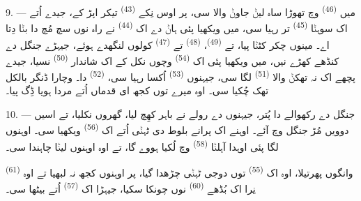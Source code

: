 9. --- میں  \textsuperscript{(46)} وچ تھوڑا ساہ لیݨ
جاوݨ والا سی، پر اوس نِکے  \textsuperscript{(43)} تیکر اپڑ کے، جیدے اُتے
اک سوہݨا  \textsuperscript{(45)} تر رہیا سی، میں ویکھیا پئی ہاݨ دے اک
 \textsuperscript{(44)} نے راہ نوں سچ مُچ دا  بݨا دِتا اے۔
مینوں چکر کٹݨا پیا، تے  \textsuperscript{(49)}، 
\textsuperscript{(48)} تے  \textsuperscript{(47)} کولوں لنگھدے ہوئے،
جیہڑے جنگل دے کنڈھے کھڑے نیں، میں ویکھیا پئی اک 
\textsuperscript{(54)} وچوں نکل کے اک شاندار  \textsuperscript{(50)}
نسیا، جیدے پچھے اک نہ تھکݨ والا  \textsuperscript{(51)}
لگا سی، جیہنوں  \textsuperscript{(53)} اُکسا رہیا سی،
 \textsuperscript{(52)} دا۔ وچارا ڈنگر بالکل تھک
چُکیا سی۔ اوہ میرے توں کجھ ای قدماں اُتے مردا ہویا ڈِگ پیا۔

10. --- جنگل دے رکھوالے دا پُتر، جیہنوں  دے رولے نے باہر کھِچ لیا، گھروں
نکلیا، تے اسیں دوویں مُڑ جنگل وچ آئے۔ اوہنے اک پرانے بلوط دی ٹہݨی اُتے اک
 \textsuperscript{(56)} ویکھیا سی۔ اوہنوں لگا پئی اوہدا آہلݨا
 \textsuperscript{(58)} وچ لُکیا ہووے گا، تے اوہ اوہنوں لیݨا چاہندا سی۔

 \textsuperscript{(61)} وانگوں پھرتیلا، اوہ اک 
\textsuperscript{(55)} توں دوجی ٹہݨی چڑھدا گیا، پر اوہنوں کجھ نہ لبھیا تے اوہ نِرا اک
بُڈھے  \textsuperscript{(60)} نوں چونکا سکیا، جیہڑا اک 
\textsuperscript{(57)} اُتے بیٹھا سی۔
\VUsaut{4.0mm}
\VUfilet{22mm}
